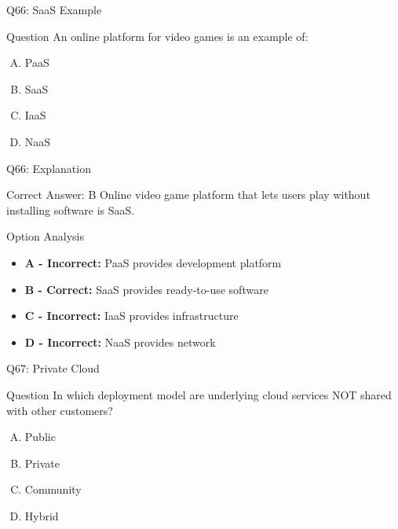 \documentclass{beamer}
\begin{document}
	\begin{frame}{Q66: SaaS Example}
		\begin{block}{Question}
			An online platform for video games is an example of:
		\end{block}
		\begin{enumerate}[(A)]
			\item PaaS
			\item SaaS
			\item IaaS
			\item NaaS
		\end{enumerate}
	\end{frame}
	
	\begin{frame}{Q66: Explanation}
		\begin{block}{Correct Answer: B}
			Online video game platform that lets users play without installing software is SaaS.
		\end{block}
		\begin{block}{Option Analysis}
			\begin{itemize}
				\item \textbf{A - Incorrect:} PaaS provides development platform
				\item \textbf{B - Correct:} SaaS provides ready-to-use software
				\item \textbf{C - Incorrect:} IaaS provides infrastructure
				\item \textbf{D - Incorrect:} NaaS provides network
			\end{itemize}
		\end{block}
	\end{frame}
	
	\begin{frame}{Q67: Private Cloud}
		\begin{block}{Question}
			In which deployment model are underlying cloud services NOT shared with other customers?
		\end{block}
		\begin{enumerate}[(A)]
			\item Public
			\item Private
			\item Community
			\item Hybrid
		\end{enumerate}
	\end{frame}
	
\end{document}
